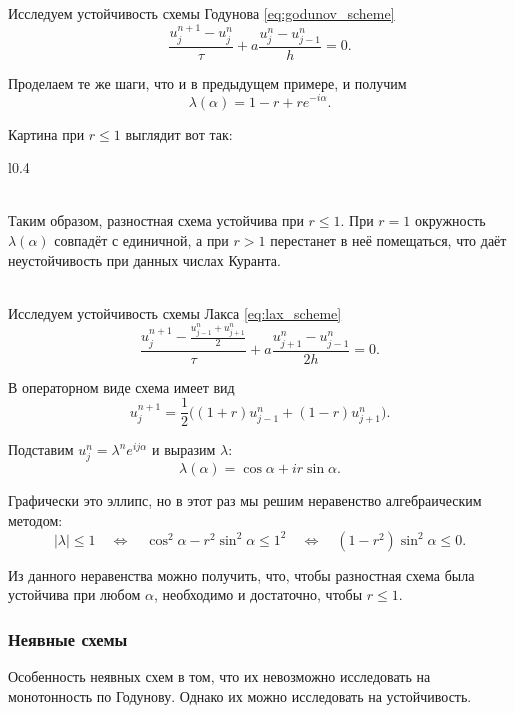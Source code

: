 \documentclass{article}
\begin{document}
\begin{example}
	Исследуем устойчивость схемы Годунова \eqref{eq:godunov_scheme}
	\[\frac{u_j^{n+1}-u_j^n}{\tau}+a\frac{u_j^n-u_{j-1}^n}{h}=0.\]

	Проделаем те же шаги, что и в предыдущем примере, и получим
	\[\lambda(\alpha)=1-r+re^{-i\alpha}.\]

	Картина при $r\le 1$ выглядит вот так:
	{\makeatletter
	\let\par\@@par
	\par{}
	\everypar{}

	\begin{wrapfigure}{l}{0.4\textwidth}
		
	\end{wrapfigure}

	\leavevmode\\
	Таким образом, разностная схема устойчива при $r\le 1$. При $r=1$
	окружность $\lambda(\alpha)$ совпадёт с единичной, а при $r>1$
	перестанет в неё помещаться, что даёт неустойчивость при данных числах
	Куранта.\\\\
	\par}
\end{example}

\begin{example}
	Исследуем устойчивость схемы Лакса \eqref{eq:lax_scheme}
	\[\frac{u_j^{n+1}-\frac{u_{j-1}^n+u_{j+1}^n}{2}}{\tau}+
	a\frac{u_{j+1}^n-u_{j-1}^n}{2h}=0.\]

	В операторном виде схема имеет вид
	\[u_j^{n+1}=\frac{1}{2}\big((1+r)u_{j-1}^n+(1-r)u_{j+1}^n\big).\]

	Подставим $u_j^n=\lambda^ne^{ij\alpha}$ и выразим $\lambda$:
	\[\lambda(\alpha)=\cos\alpha+ir\sin\alpha.\]

	Графически это эллипс, но в этот раз мы решим неравенство алгебраическим
	методом:
	\[|\lambda|\le 1\quad\Leftrightarrow\quad\cos^2\alpha-r^2\sin^2\alpha\le
	1^2\quad\Leftrightarrow\quad(1-r^2)\sin^2\alpha\le 0.\]

	Из данного неравенства можно получить, что, чтобы разностная схема была
	устойчива при любом $\alpha$, необходимо и достаточно, чтобы $r\le 1$.
\end{example}

\subsubsection{Неявные схемы}
Особенность неявных схем в том, что их невозможно исследовать на монотонность по
Годунову. Однако их можно исследовать на устойчивость.
\end{document}
